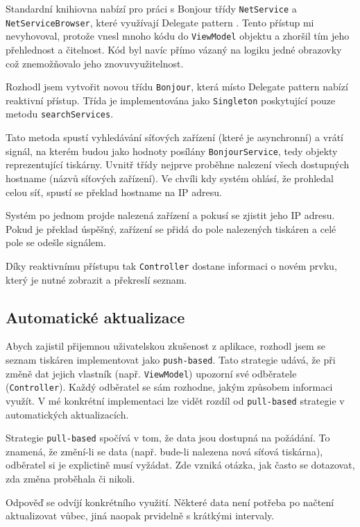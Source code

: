 Standardní knihiovna nabízí pro práci s Bonjour třídy \texttt{NetService} a \texttt{NetServiceBrowser}, které využívají Delegate pattern \cite{apple-netservicebrowser}.
Tento přístup mi nevyhovoval, protože vnesl mnoho kódu do \texttt{ViewModel} objektu a zhoršil tím jeho přehlednost a čitelnost.
Kód byl navíc přímo vázaný na logiku jedné obrazovky což znemožňovalo jeho znovuvyužitelnost.

Rozhodl jsem vytvořit novou třídu \texttt{Bonjour}, která místo Delegate pattern nabízí reaktivní přístup.
Třída je implementována jako \texttt{Singleton} \cite{thatthinginswift-singletons} poskytující pouze metodu \texttt{searchServices}.

Tato metoda spustí vyhledávání síťových zařízení (které je asynchronní) a vrátí signál, na kterém budou jako hodnoty posílány \texttt{BonjourService}, tedy objekty reprezentující tiskárny.
Uvnitř třídy nejprve proběhne nalezení všech dostupných hostname (názvů síťových zařízení).
Ve chvíli kdy systém ohlásí, že prohledal celou síť, spustí se překlad hostname na IP adresu.

Systém po jednom projde nalezená zařízení a pokusí se zjistit jeho IP adresu.
Pokud je překlad úspěšný, zařízení se přidá do pole nalezených tiskáren a celé pole se odešle signálem.

Díky reaktivnímu přístupu tak \texttt{Controller} dostane informaci o novém prvku, který je nutné zobrazit a překreslí seznam.

\subsection{Automatické aktualizace}

Abych zajistil přijemnou uživatelskou zkušenost z aplikace, rozhodl jsem se seznam tiskáren implementovat jako \texttt{push-based}.
Tato strategie udává, že při změně dat jejich vlastník (např. \texttt{ViewModel}) upozorní své odběratele (\texttt{Controller}).
Každý odběratel se sám rozhodne, jakým způsobem informaci využít.
V mé konkrétní implementaci lze vidět rozdíl od \texttt{pull-based} strategie v automatických aktualizacích.

Strategie \texttt{pull-based} spočívá v tom, že data jsou dostupná na požádání.
To znamená, že změní-li se data (např. bude-li nalezena nová síťová tiskárna), odběratel si je explictině musí vyžádat.
Zde vzniká otázka, jak často se dotazovat, zda změna proběhala či nikoli.

Odpověď se odvíjí konkrétního využití.
Některé data není potřeba po načtení aktualizovat vůbec, jiná naopak prvidelně s krátkými intervaly.

